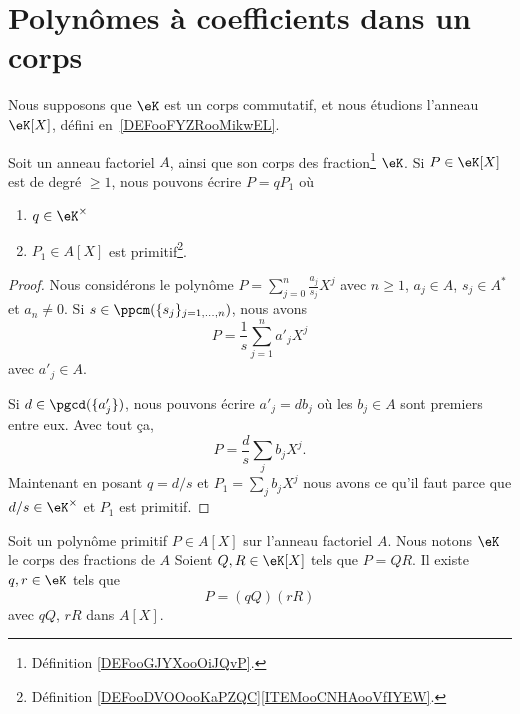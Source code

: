 \section{Polynômes à coefficients dans un corps}
\label{SECooFYOGooQHitgE}

Nous supposons que \( \eK\) est un corps commutatif, et nous étudions l'anneau \( \eK[X]\), défini en~\ref{DEFooFYZRooMikwEL}.


\begin{lemma}		\label{LEMooKSTIooSTxAll}
	Soit un anneau factoriel \( A\), ainsi que son corps des fraction\footnote{Définition \ref{DEFooGJYXooOiJQvP}.} \( \eK\). Si \( P\in \eK[X]\) est de degré \( \geq 1\), nous pouvons écrire \( P=qP_1\) où
	\begin{enumerate}
		\item
		      \( q\in \eK^{\times}\)
		\item
		      \( P_1\in A[X]\) est primitif\footnote{Définition \ref{DEFooDVOOooKaPZQC}\ref{ITEMooCNHAooVfIYEW}.}.
	\end{enumerate}
\end{lemma}

\begin{proof}
	Nous considérons le polynôme \( P=\sum_{j=0}^n\frac{ a_j }{ s_j }X^j\) avec \( n\geq 1\), \( a_j\in A\), \( s_j\in A^*\) et \( a_n\neq 0\). Si \( s\in \ppcm(\{ s_j \}_{j=1,\ldots,n})\), nous avons
	\begin{equation}
		P=\frac{1}{ s}\sum_{j=1}^na'_jX^j
	\end{equation}
	avec \( a'_j\in A\).

	Si \( d\in \pgcd(\{ a'_j \})\), nous pouvons écrire \( a'_j=db_j\) où les \( b_j\in A\) sont premiers entre eux. Avec tout ça,
	\begin{equation}
		P=\frac{ d }{ s }\sum_jb_jX^j.
	\end{equation}
	Maintenant en posant \( q=d/s\) et \( P_1=\sum_jb_jX^j\) nous avons ce qu'il faut parce que \( d/s\in \eK^{\times}\) et \( P_1\) est primitif.
\end{proof}


\begin{lemma}
	Soit un polynôme primitif \( P\in A[X]\) sur l'anneau factoriel \( A\). Nous notons \( \eK\) le corps des fractions de \( A\) Soient \( Q,R\in \eK[X]\) tels que \( P=QR\). Il existe \( q,r\in \eK\) tels que
	\begin{equation}
		P=(qQ)(rR)
	\end{equation}
	avec \( qQ\), \( rR\) dans \( A[X]\).
\end{lemma}

